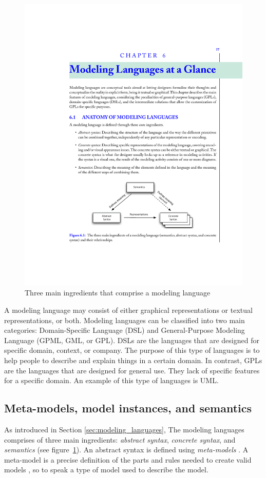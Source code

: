 \begin{figure}[H]
\centering
\captionsetup{justification=centering}
\vspace{0cm}%
\includegraphics[width=0.6\linewidth]{figure/literatures/brambilla_modeling.pdf}
\caption{Three main ingredients that comprise a modeling language \cite{Brambilla}}
\label{fig:brambilla-modeling}
\end{figure}

A modeling language may consist of either graphical representations or textual representations, or both. Modeling languages can be classified into two main categories: Domain-Specific Language (DSL) and General-Purpose Modeling Language (GPML, GML, or GPL). DSLs are the languages that are designed for specific domain, context, or company. The purpose of this type of languages is to help people to describe and explain things in a certain domain. In contrast, GPLs are the languages that are designed for general use. They lack of specific features for a specific domain. An example of this type of languages is UML. \\

\subsection*{Meta-models, model instances, and semantics}
As introduced in Section \ref{sec:modeling_languages}, The modeling languages comprises of three main ingredients: \textit{abstract syntax}, \textit{concrete syntax}, and \textit{semantics} (see figure~\ref{fig:brambilla-modeling}). An abstract syntax is defined using \textit{meta-models} \cite{Brambilla}. A meta-model is a precise definition of the parts and rules needed to create valid models \cite{Tichy}, so to speak a type of model used to describe the model.

